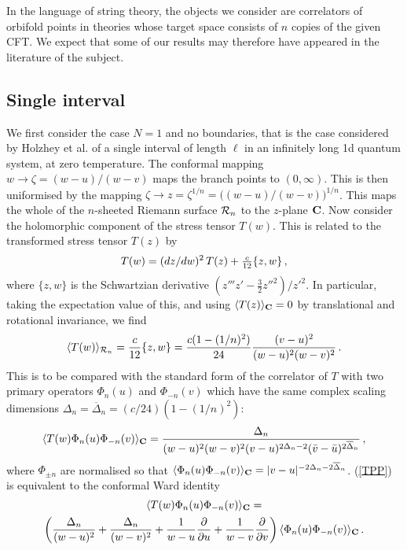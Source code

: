 \documentclass[12pt,aps]{revtex4}
\def\ffrac#1#2{\textstyle{#1\over#2}\displaystyle}
\begin{document}
In the language of string theory, the objects we consider are
correlators of orbifold points in theories whose target
space consists of $n$ copies of the given CFT. We expect that some of
our results may therefore have appeared in the literature of the subject.

\subsection{Single interval}
We first consider the case $N=1$ and no boundaries, that is the case
considered by Holzhey et al.\cite{Holzhey} of
a single interval of length $\ell$ in an infinitely long 1d quantum
system, at zero temperature.
The conformal mapping
$w\to\zeta=(w-u)/(w-v)$ maps the branch points to $(0,\infty)$. This is
then uniformised by the mapping $\zeta\to z=\zeta^{1/n}=
\big((w-u)/(w-v)\big)^{1/n}$. This maps the whole of the $n$-sheeted
Riemann surface ${\cal R}_n$ to the $z$-plane $\bf C$.
Now consider the holomorphic component
of the stress tensor $T(w)$. This is related to the transformed stress
tensor $T(z)$ by\cite{BPZ}
\begin{equation}
\label{schwartz}
T(w)=(dz/dw)^2\,T(z)+\ffrac c{12}\{z,w\}\,,
\end{equation}
where $\{z,w\}$ is the Schwartzian derivative
$(z'''z'-\frac32{z''}^2)/{z'}^2$.
In particular, taking the expectation value of this, and using $\langle
T(z)\rangle_{\bf C}=0$ by translational and rotational invariance, we find
\begin{equation}
\langle T(w)\rangle_{{\cal R}_n}=\frac c{12}\{z,w\}=
{c(1-(1/n)^2)\over 24}{(v-u)^2\over(w-u)^2(w-v)^2}\,.
\end{equation}
This is to be compared with the standard form\cite{BPZ} of the correlator of
$T$ with two primary operators $\Phi_n(u)$ and $\Phi_{-n}(v)$ which have
the same complex scaling dimensions $\Delta_n=\overline\Delta_n=
(c/24)(1-(1/n)^2)$:
\begin{equation}
\label{TPP}
\langle T(w)\Phi_n(u)\Phi_{-n}(v)\rangle_{\bf C}=
{\Delta_n\over (w-u)^2(w-v)^2(v-u)^{2\Delta_n-2}
(\bar v-\bar u)^{2\overline\Delta_n}}\,,
\end{equation}
where $\Phi_{\pm n}$ are normalised so that
$\langle \Phi_n(u)\Phi_{-n}(v)\rangle_{\bf C}=|v-u|^{-2\Delta_n
-2\overline\Delta_n}$. (\ref{TPP}) is equivalent to the
conformal Ward identity\cite{BPZ}
\begin{multline}
\label{WI}
\langle T(w)\Phi_n(u)\Phi_{-n}(v)\rangle_{\bf C}=\\
\left({\Delta_n\over(w-u)^2}+{\Delta_n\over(w-v)^2}
+{1\over w-u}{\partial\over\partial u}+
{1\over w-v}{\partial\over\partial v}\right)
\langle\Phi_n(u)\Phi_{-n}(v)\rangle_{\bf C}\,.
\end{multline}
\end{document}
